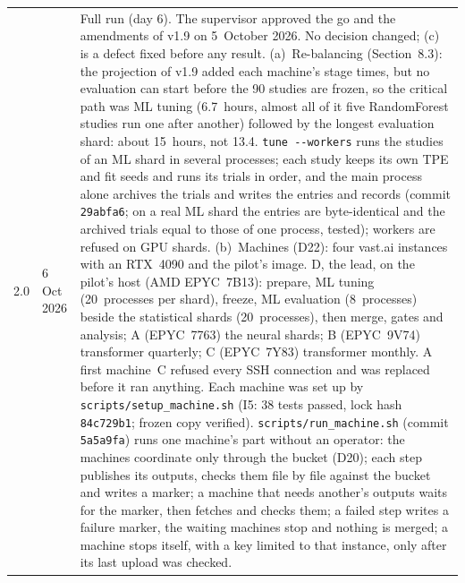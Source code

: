 \documentclass[11pt,a4paper]{article}
\newcommand{\code}[1]{\texttt{#1}}
\begin{document}
\begin{longtable}{@{}p{1.3cm} p{1.9cm} p{11.8cm}@{}}
2.0 & 6 Oct 2026 & Full run (day 6). The supervisor approved the go and the amendments of v1.9 on 5~October 2026. No decision changed; (c) is a defect fixed before any result. (a)~Re-balancing (Section~8.3): the projection of v1.9 added each machine's stage times, but no evaluation can start before the 90 studies are frozen, so the critical path was ML tuning (6.7~hours, almost all of it five RandomForest studies run one after another) followed by the longest evaluation shard: about 15~hours, not 13.4. \code{tune -{}-workers} runs the studies of an ML shard in several processes; each study keeps its own TPE and fit seeds and runs its trials in order, and the main process alone archives the trials and writes the entries and records (commit \code{29abfa6}; on a real ML shard the entries are byte-identical and the archived trials equal to those of one process, tested); workers are refused on GPU shards. (b)~Machines (D22): four vast.ai instances with an RTX~4090 and the pilot's image. D, the lead, on the pilot's host (AMD EPYC~7B13): prepare, ML tuning (20~processes per shard), freeze, ML evaluation (8~processes) beside the statistical shards (20~processes), then merge, gates and analysis; A (EPYC~7763) the neural shards; B (EPYC~9V74) transformer quarterly; C (EPYC~7Y83) transformer monthly. A first machine~C refused every SSH connection and was replaced before it ran anything. Each machine was set up by \mbox{\code{scripts/setup_machine.sh}} (I5: 38 tests passed, lock hash \code{84c729b1}; frozen copy verified). \mbox{\code{scripts/run_machine.sh}} (commit \code{5a5a9fa}) runs one machine's part without an operator: the machines coordinate only through the bucket (D20); each step publishes its outputs, checks them file by file against the bucket and writes a marker; a machine that needs another's outputs waits for the marker, then fetches and checks them; a failed step writes a failure marker, the waiting machines stop and nothing is merged; a machine stops itself, with a key limited to that instance, only after its last upload was checked. \\

\end{longtable}
\end{document}
